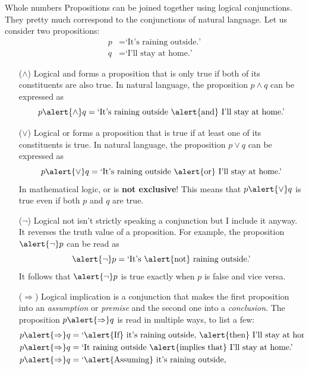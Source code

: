 \documentclass[final]{beamer}
\newlength{\colwidth}
\begin{document}
\begin{frame}[t]
\begin{columns}[t]
\begin{column}{\colwidth}
 \begin{exampleblock}{Whole numbers}
  Propositions can be joined together using \alert{logical conjunctions}. They
  pretty much correspond to the conjunctions of natural language. Let us
  consider two propositions:
  \begin{align*}
   p &= \text{`It's raining outside.'}\\
   q &= \text{`I'll stay at home.'}
  \end{align*}
  \begin{itemize}[left=40pt]
   \item[($ \wedge $)] Logical \alert{and} forms a proposition that is only
    \alert{true} if both of its constituents are also \alert{true}. In natural
    language, the proposition $p \wedge q$ can be expressed as
    \[
     p \alert{ \wedge } q = \text{`It's raining outside \alert{and} I'll stay at
     home.'}
    \]
   \item[($ \vee $)] Logical \alert{or} forms a proposition that is \alert{true}
    if at least one of its constituents is \alert{true}. In natural language,
    the proposition $p \vee q$ can be expressed as
    \[
     p \alert{ \vee } q = \text{`It's raining outside \alert{or} I'll stay at
     home.'}
    \]
    In mathematical logic, \alert{or} is \textbf{not exclusive}! This means that
    $p \alert{ \vee } q$ is true even if both $p$ and $q$ are true.
   \item[($\neg $)] Logical \alert{not} isn't strictly speaking a conjunction
    but I include it anyway. It reverses the truth value of a proposition. For
    example, the proposition $\alert{\neg }p$ can be read as
    \[
     \alert{\neg }p = \text{`It's \alert{not} raining outside.'}
    \]
    It follows that $\alert{\neg }p$ is \alert{true} exactly when $p$ is
    \alert{false} and vice versa.
   \item[($ \Rightarrow $)] Logical \alert{implication} is a conjunction that
    makes the first proposition into an \emph{assumption} or \emph{premise} and
    the second one into a \emph{conclusion}. The proposition $p \alert{
    \Rightarrow } q$ is read in multiple ways, to list a few: 
    \begin{align*}
     p \alert{ \Rightarrow } q &= \text{`\alert{If} it's raining outside,
    \alert{then} I'll stay at home.'}\\
     p \alert{ \Rightarrow } q &= \text{`It raining outside \alert{implies that}
     I'll stay at home.'}\\
     p \alert{ \Rightarrow } q &= \text{`\alert{Assuming} it's raining outside,
}
\end{align*}
\end{itemize}
\end{exampleblock}
\end{column}
\end{columns}
\end{frame}
\end{document}
